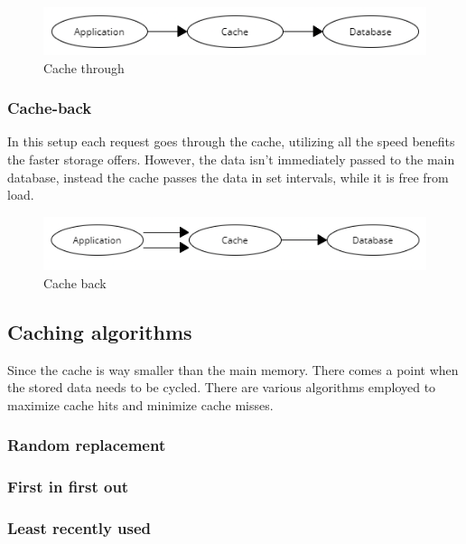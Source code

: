 \documentclass[10pt,a4paper]{article}
\begin{document}
\begin{figure}[h]
    \centering
    \includegraphics[width=1\linewidth]{Cache-through.png}
    \caption{Cache through}
    \label{fig:cache-through}
\end{figure}

\subsubsection{Cache-back}
In this setup each request goes through the cache, utilizing all the speed benefits the faster storage offers. However, the data isn't immediately passed to the main database, instead the cache passes the data in set intervals, while it is free from load.

\begin{figure}[h]
    \centering
    \includegraphics[width=1\linewidth]{Cache-back.png}
    \caption{Cache back}
    \label{fig:cache-back}
\end{figure}

\subsection{Caching algorithms}
Since the cache is way smaller than the main memory. There comes a point when the stored data needs to be cycled. There are various algorithms employed to maximize cache hits and minimize cache misses.\cite{755618}

\subsubsection{Random replacement}

\subsubsection{First in first out}

\subsubsection{Least recently used}
\end{document}
